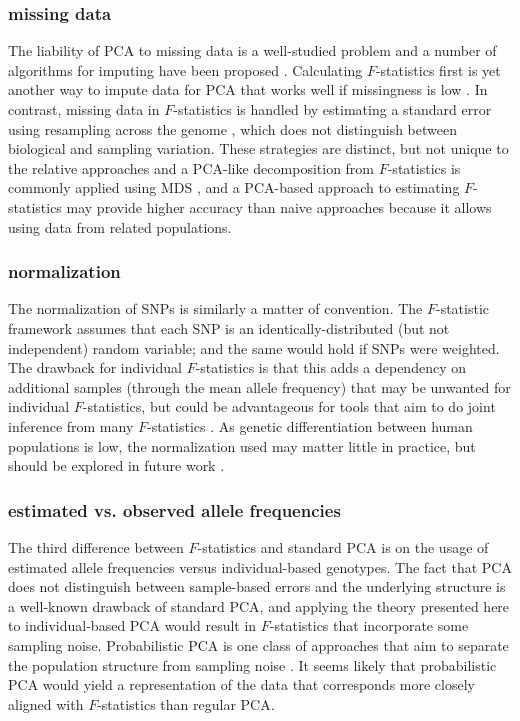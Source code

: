 \documentclass[12pt,fullpage, a4paper]{article}
\begin{document}
\subsubsection{missing data}
The liability of PCA to missing data is a well-studied problem and a number of algorithms for imputing have been proposed \citep[e.g.][]{hastie2015, meisner2017, meisner2021}. Calculating $F$-statistics first is yet another way to impute data for PCA that works well if missingness is low \citep{meisner2021}. In contrast, missing data in $F$-statistics is handled by estimating a standard error using resampling across the genome \citep{patterson2012}, which does not distinguish between biological and sampling variation. These strategies are distinct, but not unique to the relative approaches and a PCA-like decomposition from $F$-statistics is commonly applied using MDS \citep[e.g.][]{fu2016}, and a PCA-based approach to estimating $F$-statistics may provide higher accuracy than naive approaches because it allows using data from related populations.

\subsubsection{normalization}
The normalization of SNPs is similarly a matter of convention. The $F$-statistic framework assumes that each SNP is an identically-distributed (but not independent) random variable; and the same would hold if SNPs were weighted. The drawback for individual $F$-statistics is that this adds a dependency on additional samples (through the mean allele frequency) that may be unwanted for individual $F$-statistics, but could be advantageous for tools that aim to do joint inference from  many $F$-statistics \citep{patterson2012, harney2021}. As genetic differentiation between human populations is low, the  normalization used may matter little in practice, but should be explored in future work \citep{felsenstein1973}. 


\subsubsection{estimated vs. observed allele frequencies}
The third difference between $F$-statistics and standard  PCA is on the usage of estimated allele frequencies versus individual-based genotypes. The fact that PCA does not distinguish between sample-based errors and the underlying structure is a well-known drawback of standard PCA, and applying the theory presented here to individual-based PCA would result in $F$-statistics that incorporate some sampling noise. Probabilistic PCA is one class of approaches that aim to separate the population structure from sampling noise \citep[e.g.][]{agrawal2020}. It seems likely that probabilistic PCA would yield a representation of the data that corresponds more closely aligned with $F$-statistics than regular PCA.
\end{document}
